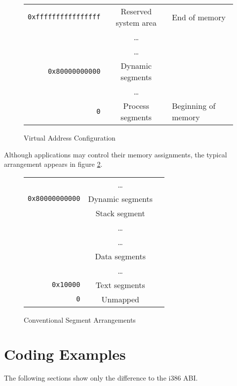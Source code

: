 \begin{figure}[H]
\Hrule
  \caption{Virtual Address Configuration}
  \label{fig-address}
  \begin{center}
    \begin{tabular}{r|c|l}
      \noalign{\smallskip}  \cline{2-2}
      \verb|0xffffffffffffffff| & Reserved system area & End of memory\\ 
      & \dots & \\ \cline{2-2}
      & \dots & \\
      \verb|0x80000000000| & Dynamic segments & \\ \cline{2-2}
      & \dots & \\
      \verb|0| & Process segments & Beginning of memory\\ \cline{2-2}
    \end{tabular}
  \end{center}
\Hrule
\end{figure}

Although applications may control their memory assignments, the typical
arrangement appears in figure \ref{fig-cfg}.

\begin{figure}[H]
\Hrule
  \caption{Conventional Segment Arrangements}
  \label{fig-cfg}
  \begin{center}
    \begin{tabular}{r|c|l}
      \cline{2-2}
      & \dots & \\
      \verb|0x80000000000| & Dynamic segments & \\ \cline{2-2}
      & Stack segment & \\ 
      & \dots & \\ \cline{2-2}
      & \dots & \\
      & Data segments & \\ \cline{2-2}
      & \dots & \\
      \verb|0x10000| & Text segments & \\ \cline{2-2}
      \verb|0| & Unmapped & \\ \cline{2-2}
    \end{tabular}
  \end{center}
\Hrule
\end{figure}

\section{Coding Examples}

The following sections show only the difference to the i386 ABI.

